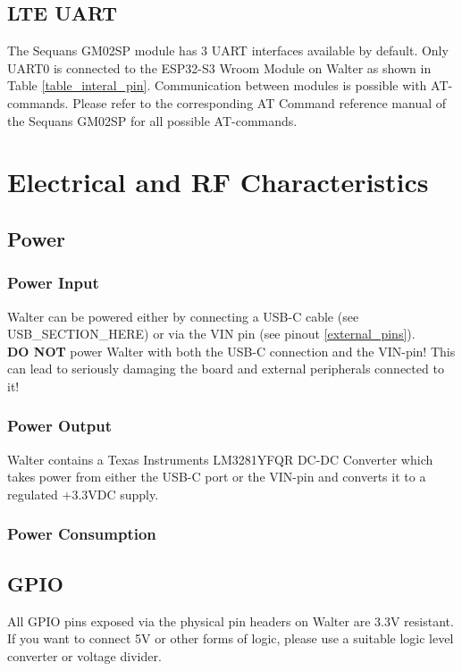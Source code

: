\documentclass[11pt]{article}
\begin{document}
\subsection{LTE UART} \label{lte_uart}
The Sequans GM02SP module has 3 UART interfaces available by default. Only UART0 is connected to the ESP32-S3 Wroom Module on Walter as shown in Table \ref{table_interal_pin}. Communication between modules is possible with AT-commands. Please refer to the corresponding AT Command reference manual of the Sequans GM02SP for all possible AT-commands.


\section{Electrical and RF Characteristics} \label{power_rf_characteristics}
\subsection{Power} \label{power}
\subsubsection{Power Input}
Walter can be powered either by connecting a USB-C cable (see USB\_SECTION\_HERE) or via the VIN pin (see pinout \ref{external_pins}).\\

\textbf{DO NOT} power Walter with both the USB-C connection and the VIN-pin! This can lead to seriously damaging the board and external peripherals connected to it!
\subsubsection{Power Output}
Walter contains a Texas Instruments LM3281YFQR DC-DC Converter which takes power from either the USB-C port or the VIN-pin and converts it to a regulated +3.3VDC supply.
\subsubsection{Power Consumption}
\subsection{GPIO} \label{gpio}
All GPIO pins exposed via the physical pin headers on Walter are 3.3V resistant. If you want to connect 5V or other forms of logic, please use a suitable logic level converter or voltage divider.\\
\end{document}
